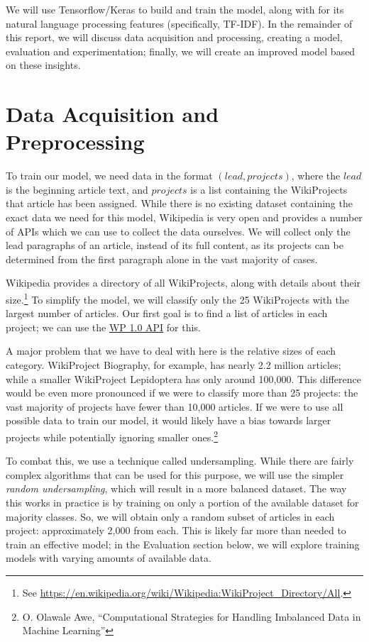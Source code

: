 \documentclass{article}
\newcommand*{\code}[1]{\texttt{\detokenize{#1}}}
\begin{document}
We will use Tensorflow/Keras to build and train the model, along with \code{scikit-learn}
for its natural language processing features (specifically, TF-IDF). In the remainder of this
report, we will discuss data acquisition and processing, creating a model, evaluation and
experimentation; finally, we will create an improved model based on these insights.

\section{Data Acquisition and Preprocessing}

To train our model, we need data in the format $(lead, projects)$, where the $lead$ is the
beginning article text, and $projects$ is a list containing the WikiProjects that article
has been assigned. While there is no existing dataset containing the exact data we need
for this model, Wikipedia is very open and provides a number of APIs which we can use to
collect the data ourselves. We will collect only the lead paragraphs of an article, instead
of its full content, as its projects can be determined from the first paragraph alone in
the vast majority of cases.

Wikipedia provides a directory of all WikiProjects, along with details about their
size.\footnote{See \url{https://en.wikipedia.org/wiki/Wikipedia:WikiProject_Directory/All}.}
To simplify the model, we will classify only the 25 WikiProjects with the largest number
of articles. Our first goal is to find a list of articles in each project; we can use
the \href{https://api.wp1.openzim.org}{WP 1.0 API} for this.

A major problem that we have to deal with here is the relative sizes of each category.
WikiProject Biography, for example, has nearly 2.2 million articles; while a smaller
WikiProject Lepidoptera has only around 100,000. This difference would be even more
pronounced if we were to classify more than 25 projects: the vast majority of projects
have fewer than 10,000 articles. If we were to use all possible data to train our model,
it would likely have a bias towards larger projects while potentially ignoring smaller
ones.\footnote{O. Olawale Awe, ``Computational Strategies for Handling Imbalanced Data in
Machine Learning''}

To combat this, we use a technique called undersampling. While there are fairly complex
algorithms that can be used for this purpose, we will use the simpler \textit{random
undersampling}, which will result in a more balanced dataset. The way this works in practice
is by training on only a portion of the available dataset for majority classes. So, we
will obtain only a random subset of articles in each project: approximately 2,000 from each.
This is likely far more than needed to train an effective model; in the Evaluation section
below, we will explore training models with varying amounts of available data.
\end{document}
